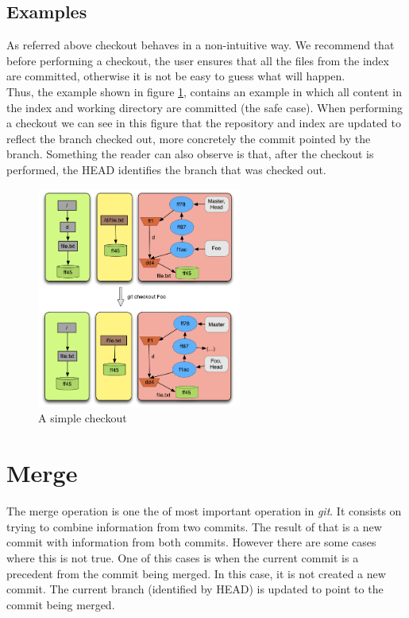 \subsection{Examples}
As referred above checkout behaves in a non-intuitive way. We recommend that
before performing a checkout, the user ensures that all the files from
the index are committed, otherwise it is not be easy to guess what will happen.\\

Thus, the example shown in figure \ref{fig:checkout}, contains an
example in which all content in the index and working directory are committed (the safe case).
When performing a checkout we can see in this figure 
that the repository and index are updated to reflect the branch checked out, more
concretely the commit pointed by the branch. Something the reader can
also observe is that, after the checkout is performed, the HEAD
identifies the branch that was checked out.\\


\begin{figure}[!t]
   \centering
   \includegraphics[width=0.6\textwidth]{images/checkout.png}
   \caption{A simple checkout}\label{fig:checkout}
\end{figure}

\section{Merge}

The merge operation is one the of most important operation in \emph{git}. It
consists on trying to combine information from two commits. The result of that
is a new commit with information from both commits. However there are some cases
where this is not true. One of this cases is when the current commit
is a precedent from the commit being merged. In this case, it is not
created a new commit. The current branch (identified by HEAD) is
updated to point to the commit being merged.\\

